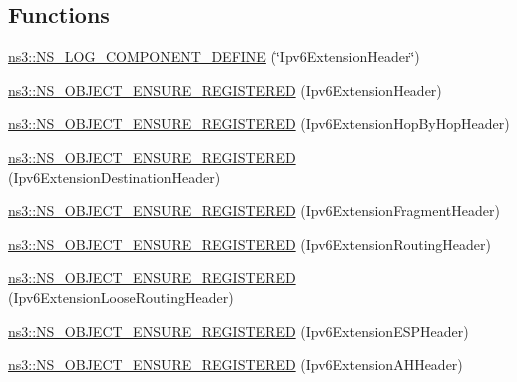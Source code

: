 \subsection*{Functions}
\begin{DoxyCompactItemize}
\item 
\hyperlink{namespacens3_a22b4d7ff5c58221de03d8df5682c97e6}{ns3\+::\+N\+S\+\_\+\+L\+O\+G\+\_\+\+C\+O\+M\+P\+O\+N\+E\+N\+T\+\_\+\+D\+E\+F\+I\+NE} (\char`\"{}Ipv6\+Extension\+Header\char`\"{})
\item 
\hyperlink{namespacens3_a5c2b833fe11cdb741e15fbb47e109054}{ns3\+::\+N\+S\+\_\+\+O\+B\+J\+E\+C\+T\+\_\+\+E\+N\+S\+U\+R\+E\+\_\+\+R\+E\+G\+I\+S\+T\+E\+R\+ED} (Ipv6\+Extension\+Header)
\item 
\hyperlink{namespacens3_afa885d58b7ae334a7eed1a2c2f7d9bf7}{ns3\+::\+N\+S\+\_\+\+O\+B\+J\+E\+C\+T\+\_\+\+E\+N\+S\+U\+R\+E\+\_\+\+R\+E\+G\+I\+S\+T\+E\+R\+ED} (Ipv6\+Extension\+Hop\+By\+Hop\+Header)
\item 
\hyperlink{namespacens3_a726f6b2b6c425edc1d818fde4450a1aa}{ns3\+::\+N\+S\+\_\+\+O\+B\+J\+E\+C\+T\+\_\+\+E\+N\+S\+U\+R\+E\+\_\+\+R\+E\+G\+I\+S\+T\+E\+R\+ED} (Ipv6\+Extension\+Destination\+Header)
\item 
\hyperlink{namespacens3_a6f23d529ed14c75670a523879ea908c1}{ns3\+::\+N\+S\+\_\+\+O\+B\+J\+E\+C\+T\+\_\+\+E\+N\+S\+U\+R\+E\+\_\+\+R\+E\+G\+I\+S\+T\+E\+R\+ED} (Ipv6\+Extension\+Fragment\+Header)
\item 
\hyperlink{namespacens3_a4b24e3c3e911c93a331e66d4df285bb2}{ns3\+::\+N\+S\+\_\+\+O\+B\+J\+E\+C\+T\+\_\+\+E\+N\+S\+U\+R\+E\+\_\+\+R\+E\+G\+I\+S\+T\+E\+R\+ED} (Ipv6\+Extension\+Routing\+Header)
\item 
\hyperlink{namespacens3_ab21db1d09b1471072fb085228c8a9307}{ns3\+::\+N\+S\+\_\+\+O\+B\+J\+E\+C\+T\+\_\+\+E\+N\+S\+U\+R\+E\+\_\+\+R\+E\+G\+I\+S\+T\+E\+R\+ED} (Ipv6\+Extension\+Loose\+Routing\+Header)
\item 
\hyperlink{namespacens3_a9911d3d9e80bcb7b7532b945d7bdd1ac}{ns3\+::\+N\+S\+\_\+\+O\+B\+J\+E\+C\+T\+\_\+\+E\+N\+S\+U\+R\+E\+\_\+\+R\+E\+G\+I\+S\+T\+E\+R\+ED} (Ipv6\+Extension\+E\+S\+P\+Header)
\item 
\hyperlink{namespacens3_a0e6f0d1aba4a1f0518c5f87facdccd96}{ns3\+::\+N\+S\+\_\+\+O\+B\+J\+E\+C\+T\+\_\+\+E\+N\+S\+U\+R\+E\+\_\+\+R\+E\+G\+I\+S\+T\+E\+R\+ED} (Ipv6\+Extension\+A\+H\+Header)
\end{DoxyCompactItemize}
